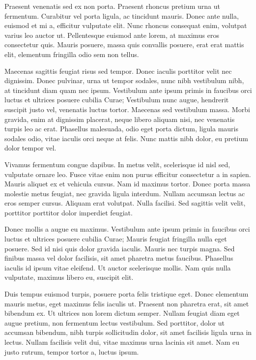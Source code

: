 \documentclass[12pt, letterpaper,twocolumn]{article}
\begin{document}
Praesent venenatis sed ex non porta. Praesent rhoncus pretium urna ut fermentum. Curabitur vel porta ligula, ac tincidunt mauris. Donec ante nulla, euismod et mi a, efficitur vulputate elit. Nunc rhoncus consequat enim, volutpat varius leo auctor ut. Pellentesque euismod ante lorem, at maximus eros consectetur quis. Mauris posuere, massa quis convallis posuere, erat erat mattis elit, elementum fringilla odio sem non tellus.

Maecenas sagittis feugiat risus sed tempor. Donec iaculis porttitor velit nec dignissim. Donec pulvinar, urna ut tempor sodales, nunc nibh vestibulum nibh, at tincidunt diam quam nec ipsum. Vestibulum ante ipsum primis in faucibus orci luctus et ultrices posuere cubilia Curae; Vestibulum nunc augue, hendrerit suscipit justo vel, venenatis luctus tortor. Maecenas sed vestibulum massa. Morbi gravida, enim at dignissim placerat, neque libero aliquam nisi, nec venenatis turpis leo ac erat. Phasellus malesuada, odio eget porta dictum, ligula mauris sodales odio, vitae iaculis orci neque at felis. Nunc mattis nibh dolor, eu pretium dolor tempor vel.

Vivamus fermentum congue dapibus. In metus velit, scelerisque id nisl sed, vulputate ornare leo. Fusce vitae enim non purus efficitur consectetur a in sapien. Mauris aliquet ex et vehicula cursus. Nam id maximus tortor. Donec porta massa molestie metus feugiat, nec gravida ligula interdum. Nullam accumsan lectus ac eros semper cursus. Aliquam erat volutpat. Nulla facilisi. Sed sagittis velit velit, porttitor porttitor dolor imperdiet feugiat.

Donec mollis a augue eu maximus. Vestibulum ante ipsum primis in faucibus orci luctus et ultrices posuere cubilia Curae; Mauris feugiat fringilla nulla eget posuere. Sed id nisi quis dolor gravida iaculis. Mauris nec turpis magna. Sed finibus massa vel dolor facilisis, sit amet pharetra metus faucibus. Phasellus iaculis id ipsum vitae eleifend. Ut auctor scelerisque mollis. Nam quis nulla vulputate, maximus libero eu, suscipit elit.

Duis tempus euismod turpis, posuere porta felis tristique eget. Donec elementum mauris metus, eget maximus felis iaculis ut. Praesent non pharetra erat, sit amet bibendum ex. Ut ultrices non lorem dictum semper. Nullam feugiat diam eget augue pretium, non fermentum lectus vestibulum. Sed porttitor, dolor ut accumsan bibendum, nibh turpis sollicitudin dolor, sit amet facilisis ligula urna in lectus. Nullam facilisis velit dui, vitae maximus urna lacinia sit amet. Nam eu justo rutrum, tempor tortor a, luctus ipsum.
\end{document}
